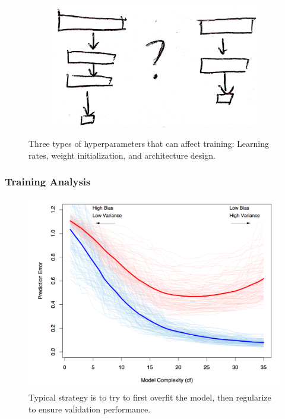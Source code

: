 \documentclass[10pt,mathserif]{beamer}
\begin{document}
\begin{frame}
\begin{figure}[ht]
\begin{subfigure}{.2\paperwidth}
    \end{subfigure}
    \begin{subfigure}{.2\paperwidth}
      \centering
      \includegraphics[width=0.17\paperwidth]{figure/architecture_choice}
    \end{subfigure}
  \caption{Three types of hyperparameters that can affect training: Learning
    rates, weight initialization, and architecture
    design. \label{fig:hyperparameters} }
\end{figure}
\end{frame}

\begin{frame}
  \frametitle{Training Analysis}
  \begin{figure}[ht]
    \centering
    \includegraphics[width=0.7\paperwidth]{figure/bias_variance}
    \caption{Typical strategy is to try to first overfit the model, then
      regularize to ensure validation performance. \label{fig:bias_variance} }
  \end{figure}
\end{frame}
\end{document}
